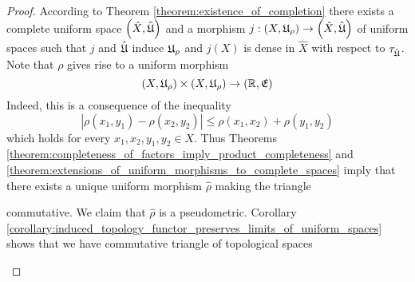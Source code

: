 \begin{proof}
According to Theorem \ref{theorem:existence_of_completion} there exists a complete uniform space $\left(\hat{X},\hat{{\mathfrak U}}\right)$ and a morphism $j:\left(X,{\mathfrak U}_{\rho}\right) \rightarrow \left(\hat{X},\hat{{\mathfrak U}}\right)$ of uniform spaces such that $j$ and $\hat{{\mathfrak U}}$ induce ${\mathfrak U}_{\rho}$ and $j(X)$ is dense in $\hat{X}$ with respect to $\tau_{\hat{{\mathfrak U}}}$. Note that $\rho$ gives rise to a uniform morphism 
$$\left(X,{\mathfrak U}_{\rho}\right)\times \left(X,{\mathfrak U}_{\rho}\right)\rightarrow \left({\mathbb R},{\mathfrak E}\right)$$
Indeed, this is a consequence of the inequality
$$|\rho(x_1,y_1) - \rho(x_2,y_2)|\leq \rho(x_1,x_2) + \rho(y_1,y_2)$$
which holds for every $x_1,x_2,y_1,y_2\in X$. Thus Theorems \ref{theorem:completeness_of_factors_imply_product_completeness} and \ref{theorem:extensions_of_uniform_morphisms_to_complete_spaces} imply that there exists a unique uniform morphism $\hat{\rho}$ making the triangle
\begin{center}
\end{center}
commutative. We claim that $\hat{\rho}$ is a pseudometric. Corollary \ref{corollary:induced_topology_functor_preserves_limits_of_uniform_spaces} shows that we have commutative triangle of topological spaces
\begin{center}
\end{center}
\end{proof}
